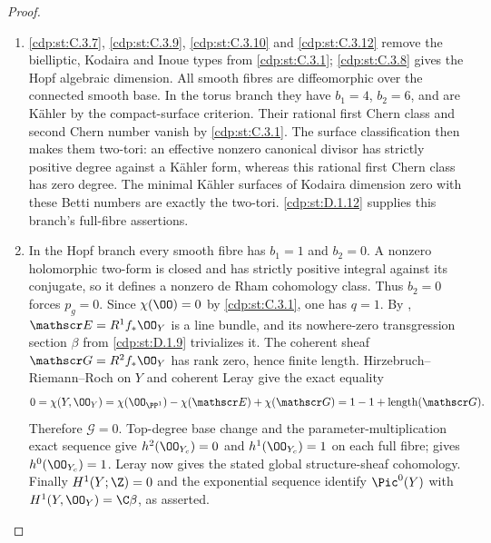 \begin{proof}

\begin{enumerate}[label={$\langle1\rangle$\arabic*.},leftmargin=*]
\item \ref{cdp:st:C.3.7}, \ref{cdp:st:C.3.9}, \ref{cdp:st:C.3.10} and \ref{cdp:st:C.3.12} remove the bielliptic,
Kodaira and Inoue types from \ref{cdp:st:C.3.1}; \ref{cdp:st:C.3.8} gives the Hopf algebraic
dimension. All smooth fibres are diffeomorphic over the
connected smooth base. In the torus branch they have
$b_1=4$, $b_2=6$, and are K\"ahler by the compact-surface
criterion. Their rational first Chern class and second
Chern number vanish by \ref{cdp:st:C.3.1}. The surface classification
then makes them two-tori: an effective nonzero canonical
divisor has strictly positive degree against a K\"ahler
form, whereas this rational first Chern class has zero
degree. The minimal K\"ahler surfaces of Kodaira dimension
zero with these Betti numbers are exactly the two-tori.
\ref{cdp:st:D.1.12} supplies this branch's full-fibre assertions.

\item In the Hopf branch every smooth fibre has
$b_1=1$ and $b_2=0$. A nonzero holomorphic two-form
is closed and has strictly positive integral against
its conjugate, so it defines a nonzero de Rham
cohomology class. Thus $b_2=0$ forces $p_g=0$.
Since $\chi(\OO)=0$ by \ref{cdp:st:C.3.1}, one has $q=1$.
By \cite[Theorem~2.2, pp.~4--5]{Viaclovsky2026Combs}, $\mathscr E=R^1f_*\OO_Y$ is a line bundle,
and its nowhere-zero transgression section $\beta$
from \ref{cdp:st:D.1.9} trivializes it. The coherent sheaf
$\mathscr G=R^2f_*\OO_Y$ has rank zero, hence finite
length. Hirzebruch--Riemann--Roch on $Y$ and coherent
Leray give the exact equality
\[
 0=\chi(Y,\OO_Y)
   =\chi(\OO_{\PP^1})-\chi(\mathscr E)+\chi(\mathscr G)
   =1-1+\operatorname{length}(\mathscr G).
\]
Therefore $\mathscr G=0$. Top-degree base change and
the parameter-multiplication exact sequence give
$h^2(\OO_{Y_c})=0$ and $h^1(\OO_{Y_c})=1$ on each
full fibre; \cite[Theorem~2.2, pp.~4--5]{Viaclovsky2026Combs} gives $h^0(\OO_{Y_c})=1$.
Leray now gives the stated global structure-sheaf
cohomology. Finally $H^1(Y;\Z)=0$ and the exponential
sequence identify $\Pic^0(Y)$ with
$H^1(Y,\OO_Y)=\C\beta$, as asserted.

\end{enumerate}
\end{proof}